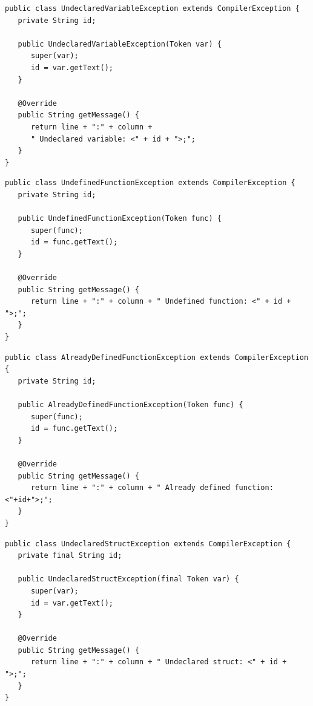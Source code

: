 \begin{lstlisting}[frame=htrbl, caption={Implementation of {\ttfamily UndeclaredVariableException.java}}, label={lst:undeclared_variable_exception}, basicstyle=\footnotesize]
public class UndeclaredVariableException extends CompilerException {
   private String id;

   public UndeclaredVariableException(Token var) {
      super(var);
      id = var.getText();
   }

   @Override
   public String getMessage() {
      return line + ":" + column + 
      " Undeclared variable: <" + id + ">;";
   }
}
\end{lstlisting}

\begin{lstlisting}[frame=htrbl, caption={Implementation of {\ttfamily UndefinedFunctionException.java}}, label={lst:undefined_function_exception}, basicstyle=\footnotesize]
public class UndefinedFunctionException extends CompilerException {
   private String id;
   
   public UndefinedFunctionException(Token func) {
      super(func);
      id = func.getText();
   }

   @Override
   public String getMessage() {
      return line + ":" + column + " Undefined function: <" + id + ">;";
   }
}
\end{lstlisting}

\begin{lstlisting}[frame=htrbl, caption={Implementation of {\ttfamily AlreadyDefinedFunctionException.java}}, label={lst:already_defined_function_exception}, basicstyle=\footnotesize]
public class AlreadyDefinedFunctionException extends CompilerException {
   private String id;

   public AlreadyDefinedFunctionException(Token func) {
      super(func);
      id = func.getText();
   }

   @Override
   public String getMessage() {
      return line + ":" + column + " Already defined function: <"+id+">;";
   }
}
\end{lstlisting}

\begin{lstlisting}[frame=htrbl, caption={Implementation of {\ttfamily UndeclaredStructException.java}}, label={lst:undeclared_struct_exception}, basicstyle=\footnotesize]
public class UndeclaredStructException extends CompilerException {
   private final String id;

   public UndeclaredStructException(final Token var) {
      super(var);
      id = var.getText();
   }

   @Override
   public String getMessage() {
      return line + ":" + column + " Undeclared struct: <" + id + ">;";
   }
}
\end{lstlisting}

